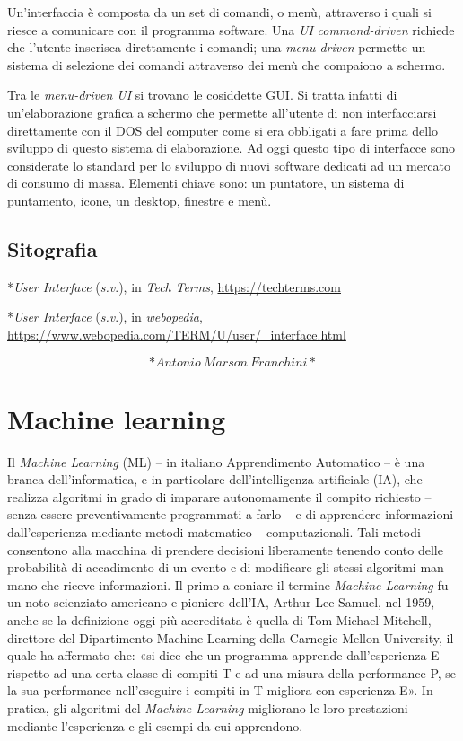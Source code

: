 \documentclass[
  b5paper,
  twoside,
  12pt,
  chapterprefix=false,
  bibliography=totocnumbered,
  parskip=false]{scrbook}
\begin{document}
Un'interfaccia è composta da un set di comandi, o menù, attraverso i
quali si riesce a comunicare con il programma software. Una \emph{UI}
\emph{command-driven} richiede che l'utente inserisca direttamente i comandi;
una \emph{menu-driven} permette un sistema di selezione dei comandi
attraverso dei menù che compaiono a schermo.

Tra le \emph{menu-driven UI} si trovano le cosiddette GUI. Si tratta infatti
di un'elaborazione grafica a schermo che permette all'utente di non
interfacciarsi direttamente con il DOS del computer come si era
obbligati a fare prima dello sviluppo di questo sistema di elaborazione.
Ad oggi questo tipo di interfacce sono considerate lo standard per lo
sviluppo di nuovi software dedicati ad un mercato di consumo di massa.
Elementi chiave sono: un puntatore, un sistema di puntamento, icone, un
desktop, finestre e menù.

\hypertarget{sitografia-20}{%
\section*{Sitografia}\label{sitografia-20}}

*\emph{User Interface} (\emph{s.v}.), in \emph{Tech} \emph{Terms},
\url{https://techterms.com}

*\emph{User Interface} (\emph{s.v}.), in \emph{webopedia},
\url{https://www.webopedia.com/TERM/U/user/_interface.html}

\[*Antonio~Marson~Franchini*\]

\hypertarget{machine-learning}{%
\chapter{Machine learning}\label{machine-learning}}

Il \emph{Machine Learning} (ML) -- in italiano Apprendimento Automatico -- è
una branca dell'informatica, e in particolare dell'intelligenza
artificiale (IA), che realizza algoritmi in grado di imparare
autonomamente il compito richiesto -- senza essere preventivamente
programmati a farlo -- e di apprendere informazioni dall'esperienza
mediante metodi matematico -- computazionali. Tali metodi consentono
alla macchina di prendere decisioni liberamente tenendo conto delle
probabilità di accadimento di un evento e di modificare gli stessi
algoritmi man mano che riceve informazioni. Il primo a coniare il
termine \emph{Machine Learning} fu un noto scienziato americano e pioniere
dell'IA, Arthur Lee Samuel, nel 1959, anche se la definizione oggi più
accreditata è quella di Tom Michael Mitchell, direttore del
Dipartimento Machine Learning della Carnegie Mellon University, il
quale ha affermato che: «si dice che un programma apprende
dall'esperienza E rispetto ad una certa classe di compiti T e ad una
misura della performance P, se la sua performance nell'eseguire i
compiti in T migliora con esperienza E». In pratica, gli algoritmi del
\emph{Machine Learning} migliorano le loro prestazioni mediante l'esperienza
e gli esempi da cui apprendono.~
\end{document}
